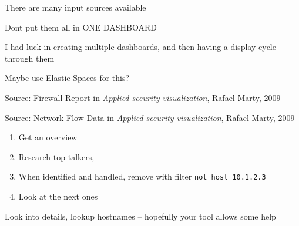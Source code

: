 \documentclass[Screen16to9,17pt]{foils}
\begin{document}
\begin{list2}
\item There are many input sources available
\item Dont put them all in ONE DASHBOARD
\item I had luck in creating multiple dashboards, and then having a display cycle through them
\item Maybe use Elastic Spaces for this? 
\end{list2}





Source: Firewall Report in \emph{Applied security visualization}, Rafael Marty, 2009




Source: Network Flow Data in \emph{Applied security visualization}, Rafael Marty, 2009





\begin{quote}

\end{quote}

\begin{enumerate}
\item Get an overview
\item Research top talkers,
\item When identified and handled, remove with filter \verb+not host 10.1.2.3+
\item Look at the next ones
\end{enumerate}

Look into details, lookup hostnames -- hopefully your tool allows some help




\end{document}
